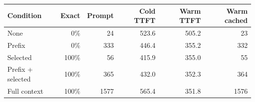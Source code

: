 \begin{tabular}{lrrrrr}
\toprule
Condition & Exact & Prompt & Cold TTFT & Warm TTFT & Warm cached \\
\midrule
None & 0\% & 24 & 523.6 & 505.2 & 23 \\
Prefix & 0\% & 333 & 446.4 & 355.2 & 332 \\
Selected & 100\% & 56 & 415.9 & 355.0 & 55 \\
Prefix + selected & 100\% & 365 & 432.0 & 352.3 & 364 \\
Full context & 100\% & 1577 & 565.4 & 351.8 & 1576 \\
\bottomrule
\end{tabular}
